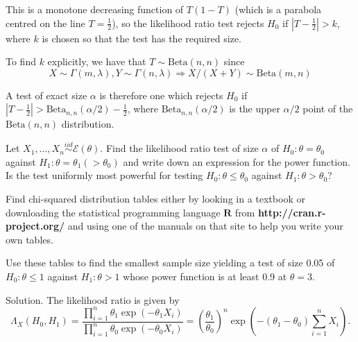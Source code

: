 This is a monotone decreasing function of $T(1-T)$ (which is a parabola centred on the line $T=\frac 12$), so the likelihood ratio test rejects $H_0$ if $\left|T-\frac 12\right|>k$, where $k$ is chosen so that the test has the required size.

To find $k$ explicitly, we have that $T\sim\text{Beta}(n,n)$ since
\begin{equation}
X\sim\Gamma(m,\lambda),Y\sim\Gamma(n,\lambda)\Rightarrow X/(X+Y)\sim \text{Beta}(m,n)
\end{equation}

A test of exact size $\alpha$ is therefore one which rejects $H_0$ if $\left|T-\frac 12\right|>\text{Beta}_{n,n}(\alpha/2)-\frac 12$, where $\text{Beta}_{n,n}(\alpha/2)$ is the upper $\alpha/2$ point of the $\text{Beta}(n,n)$ distribution.





\item Let $X_1,\dots,X_n\stackrel{iid}{\sim}\mathcal{E}(\theta)$. Find the likelihood ratio test of size $\alpha$ of $H_0:\theta=\theta_0$ against $H_1:\theta= \theta_1(>\theta_0)$ and write down an expression for the power function. Is the test uniformly most powerful for testing $H_0:\theta\leq\theta_0$ against $H_1:\theta >\theta_0$?

Find chi-squared distribution tables either by looking in a textbook or downloading the statistical programming language $\mathbf{R}$ from {\bf http://cran.r-project.org/} and using one of the manuals on that site to help you write your own tables.

Use these tables to find the smallest sample size yielding a test of size 0.05 of $H_0:\theta\leq 1$ against $H_1:\theta >1$ whose power function is at least 0.9 at $\theta=3$.



Solution. The likelihood ratio is given by
\begin{equation}
\Lambda_{X}(H_0,H_1) = \frac{\prod^n_{i=1}\theta_1\exp(-\theta_1X_i)}{\prod^n_{i=1}\theta_0\exp(-\theta_0X_i)} = \left(\frac{\theta_1}{\theta_0}\right)^n\exp\left(-(\theta_1-\theta_0)\sum^n_{i=1}X_i\right).
\end{equation}

